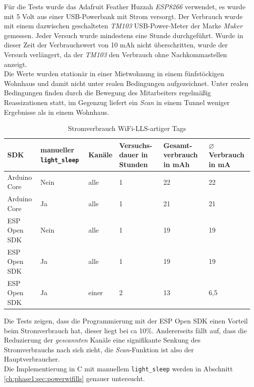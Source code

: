 Für die Tests wurde das Adafruit Feather Huzzah \emph{ESP8266} verwendet, es wurde mit 5 Volt aus einer USB-Powerbank mit Strom versorgt.
Der Verbrauch wurde mit einem dazwischen geschalteten \emph{TM103} USB-Power-Meter der Marke \emph{Muker} gemessen. 
Jeder Versuch wurde mindestens eine Stunde durchgeführt.
Wurde in dieser Zeit der Verbrauchswert von 10 mAh nicht überschritten, wurde der Versuch verlängert, da der \emph{TM103} den Verbrauch ohne Nachkommastellen anzeigt.\\
Die Werte wurden stationär in einer Mietwohnung in einem fünfstöckigen Wohnhaus und damit nicht unter realen Bedingungen aufgezeichnet.
Unter realen Bedingungen finden durch die Bewegung des Mitarbeiters regelmäßig Reassizationen statt, im Gegenzug liefert ein \emph{Scan} in einem Tunnel weniger Ergebnisse als in einem Wohnhaus.


\begin{table}[h]
	\centering
	\caption{Stromverbrauch WiFi-LLS-artiger Tags}
	\label{table:llsconsumption}
	\begin{tabular}{l|p{2.2cm}|l|p{2cm}|p{2cm}|p{2cm}}
		SDK & manueller \texttt{light\_sleep} & Kanäle & Versuchs-dauer in Stunden & Gesamt-verbrauch in mAh & $\varnothing$ Verbrauch in mA  \\
		\hline
		Arduino Core & Nein & alle & 1 & 22 & 22 \\
		Arduino Core & Ja & alle & 1 & 21 & 21 \\
		ESP Open SDK & Nein & alle & 1 & 19 & 19 \\
		ESP Open SDK & Ja & alle & 1 & 19 & 19 \\
		\hline
		ESP Open SDK & Ja & einer & 2 & 13 & 6,5 \\
	\end{tabular}
\end{table}

Die Tests zeigen, dass die Programmierung mit der ESP Open SDK einen Vorteil beim Stromverbrauch hat, dieser liegt bei ca 10\%.
Andererseits fällt auf, dass die Reduzierung der \emph{gescannten} Kanäle eine signifikante Senkung des Stromverbrauchs nach sich zieht, die \emph{Scan}-Funktion ist also der Hauptverbraucher.\\
Die Implementierung in C mit manuellem \texttt{light\_sleep} werden in Abschnitt \ref{ch:phase1:sec:powerwifills} genauer untersucht.









